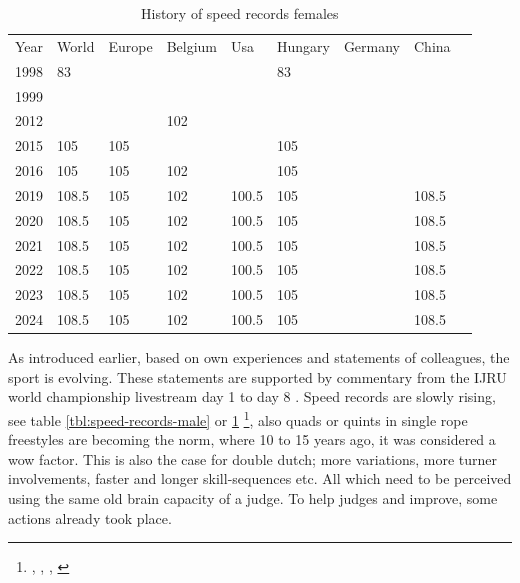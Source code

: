\begin{table}[]
    \begin{tabular}{lllllllll}
        Year & World & Europe & Belgium & Usa   & Hungary & Germany & China \\
        1998 & 83    &        &         &       & 83      &         &       \\
        1999 &       &        &         &       &         &         &       \\
        2012 &       &        & 102     &       &         &         &       \\
        2015 & 105   & 105    &         &       & 105     &         &       \\
        2016 & 105   & 105    & 102     &       & 105     &         &       \\
        2019 & 108.5 & 105    & 102     & 100.5 & 105     &         & 108.5 \\
        2020 & 108.5 & 105    & 102     & 100.5 & 105     &         & 108.5 \\
        2021 & 108.5 & 105    & 102     & 100.5 & 105     &         & 108.5 \\
        2022 & 108.5 & 105    & 102     & 100.5 & 105     &         & 108.5 \\
        2023 & 108.5 & 105    & 102     & 100.5 & 105     &         & 108.5 \\
        2024 & 108.5 & 105    & 102     & 100.5 & 105     &         & 108.5
    \end{tabular}
    \caption{History of speed records females}
    \label{tbl:speed-records-female}
\end{table}

As introduced earlier, based on own experiences and statements of colleagues, the sport is evolving. These statements are supported by commentary from the IJRU world championship livestream day 1 \autocite{IJRU_yt_2023_livestream_day1} to day 8 \autocite{IJRU_yt_2023_livestream_day8}.
Speed records are slowly rising, see table \ref{tbl:speed-records-male} or \ref{tbl:speed-records-female} \footnote{\autocite{www_speed_30s_1999_WORLD}, \autocite{www_speed_30s_2024_BE}, \autocite{www_speed_30s_2024_IJRU_WORLD}, \autocite{www_speed_30s_2024_USA_AMJRF}}, also quads or quints in single rope freestyles are becoming the norm, where 10 to 15 years ago, it was considered a wow factor. This is also the case for double dutch; more variations, more turner involvements, faster and longer skill-sequences etc.
All which need to be perceived using the same old brain capacity of a judge.
To help judges and improve, some actions already took place.

